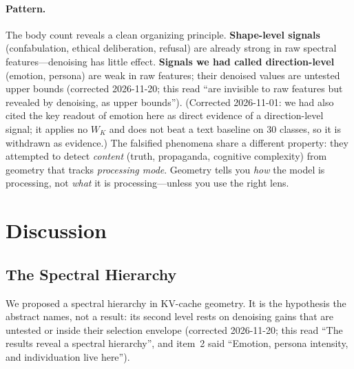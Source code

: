 \documentclass[11pt,a4paper]{article}
\begin{document}
\paragraph{Pattern.} The body count reveals a clean organizing principle.
\textbf{Shape-level signals} (confabulation, ethical deliberation,
refusal) are already strong in raw spectral features---denoising has little
effect. \textbf{Signals we had called direction-level} (emotion, persona) are
weak in raw features; their denoised values are untested upper bounds
(corrected 2026-11-20; this read ``are invisible to raw features but revealed
by denoising, as upper bounds''). (Corrected
2026-11-01: we had also cited the key readout of emotion here as direct
evidence of a direction-level signal; it applies no $W_K$ and does not beat
a text baseline on 30 classes, so it is withdrawn as evidence.) The falsified
phenomena share a different property: they attempted to detect \emph{content}
(truth, propaganda, cognitive complexity) from geometry that tracks
\emph{processing mode}. Geometry tells you \emph{how} the model is
processing, not \emph{what} it is processing---unless you use the right lens.

\section{Discussion}
\label{sec:discussion}

\subsection{The Spectral Hierarchy}
\label{sec:hierarchy}

We proposed a spectral hierarchy in KV-cache geometry. It is the hypothesis
the abstract names, not a result: its second level rests on denoising gains
that are untested or inside their selection envelope (corrected 2026-11-20;
this read ``The results reveal a spectral hierarchy'', and item~2 said
``Emotion, persona intensity, and individuation live here'').
\end{document}

